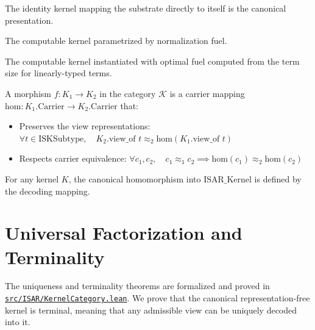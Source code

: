 \begin{definition}
The identity kernel mapping the substrate directly to itself is the canonical presentation.
\end{definition}

\begin{definition}
The computable kernel parametrized by normalization fuel.
\end{definition}

\begin{definition}
The computable kernel instantiated with optimal fuel computed from the term size for linearly-typed terms.
\end{definition}

\begin{definition}
A morphism $f : K_1 \to K_2$ in the category $\mathcal{K}$ is a carrier mapping $\text{hom} : K_1.\text{Carrier} \to K_2.\text{Carrier}$ that:
\begin{itemize}
    \item Preserves the view representations: $\forall t \in \text{ISKSubtype}, \quad K_2.\text{view\_of } t \approx_2 \text{hom}(K_1.\text{view\_of } t)$
    \item Respects carrier equivalence: $\forall c_1, c_2, \quad c_1 \approx_1 c_2 \implies \text{hom}(c_1) \approx_2 \text{hom}(c_2)$
\end{itemize}
\end{definition}

\begin{definition}
For any kernel $K$, the canonical homomorphism into $\text{ISAR\_Kernel}$ is defined by the decoding mapping.
\end{definition}

\section{Universal Factorization and Terminality}

The uniqueness and terminality theorems are formalized and proved in \href{https://github.com/cypoe/isar-proofs/blob/master/src/ISAR/KernelCategory.lean}{\texttt{src/ISAR/KernelCategory.lean}}. We prove that the canonical representation-free kernel is terminal, meaning that any admissible view can be uniquely decoded into it.

